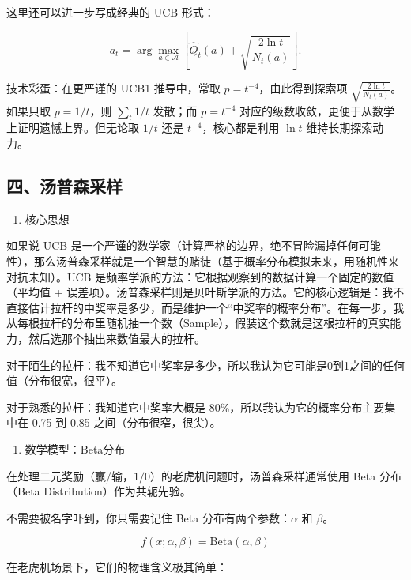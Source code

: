 这里还可以进一步写成经典的 UCB 形式：

\[
a_t=\arg\max_{a\in\mathcal{A}}[\hat{Q}_t(a)+\sqrt{\frac{2\ln t}{N_t(a)}}].
\]

技术彩蛋：在更严谨的 UCB1 推导中，常取 \(p=t^{-4}\)，由此得到探索项 \(\sqrt{\frac{2\ln t}{N_t(a)}}\)。如果只取 \(p=1/t\)，则 \(\sum_t 1/t\) 发散；而 \(p=t^{-4}\) 对应的级数收敛，更便于从数学上证明遗憾上界。但无论取 \(1/t\) 还是 \(t^{-4}\)，核心都是利用 \(\ln t\) 维持长期探索动力。

\hypertarget{ux56dbux6c64ux666eux68eeux91c7ux6837}{%
\subsection{四、汤普森采样}\label{ux56dbux6c64ux666eux68eeux91c7ux6837}}

\begin{enumerate}
\def\labelenumi{\arabic{enumi}.}
\tightlist
\item
  核心思想
\end{enumerate}

如果说 UCB 是一个严谨的数学家（计算严格的边界，绝不冒险漏掉任何可能性），那么汤普森采样就是一个智慧的赌徒（基于概率分布模拟未来，用随机性来对抗未知）。UCB 是频率学派的方法：它根据观察到的数据计算一个固定的数值（平均值 + 误差项）。汤普森采样则是贝叶斯学派的方法。它的核心逻辑是：我不直接估计拉杆的中奖率是多少，而是维护一个``中奖率的概率分布''。在每一步，我从每根拉杆的分布里随机抽一个数（Sample），假装这个数就是这根拉杆的真实能力，然后选那个抽出来数值最大的拉杆。

对于陌生的拉杆：我不知道它中奖率是多少，所以我认为它可能是0到1之间的任何值（分布很宽，很平）。

对于熟悉的拉杆：我知道它中奖率大概是 80\%，所以我认为它的概率分布主要集中在 0.75 到 0.85 之间（分布很窄，很尖）。

\begin{enumerate}
\def\labelenumi{\arabic{enumi}.}
\setcounter{enumi}{1}
\tightlist
\item
  数学模型：Beta分布
\end{enumerate}

在处理二元奖励（赢/输，\(1/0\)）的老虎机问题时，汤普森采样通常使用 Beta 分布（Beta Distribution）作为共轭先验。

不需要被名字吓到，你只需要记住 Beta 分布有两个参数：\(\alpha\) 和 \(\beta\)。

\[
f(x;\alpha,\beta)=\mathrm{Beta}(\alpha,\beta)
\]

在老虎机场景下，它们的物理含义极其简单：

